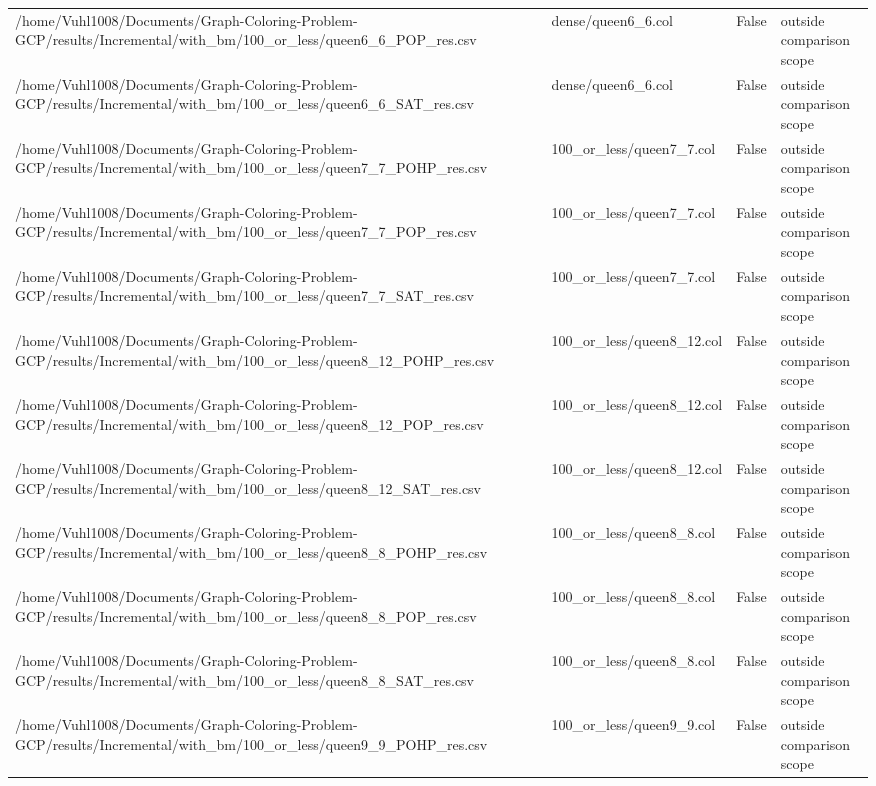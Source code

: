 \begin{table}[htbp]
\begin{tabular}{llll}
/home/Vuhl1008/Documents/Graph-Coloring-Problem-GCP/results/Incremental/with\_bm/100\_or\_less/queen6\_6\_POP\_res.csv & dense/queen6\_6.col & False & outside comparison scope \\
/home/Vuhl1008/Documents/Graph-Coloring-Problem-GCP/results/Incremental/with\_bm/100\_or\_less/queen6\_6\_SAT\_res.csv & dense/queen6\_6.col & False & outside comparison scope \\
/home/Vuhl1008/Documents/Graph-Coloring-Problem-GCP/results/Incremental/with\_bm/100\_or\_less/queen7\_7\_POHP\_res.csv & 100\_or\_less/queen7\_7.col & False & outside comparison scope \\
/home/Vuhl1008/Documents/Graph-Coloring-Problem-GCP/results/Incremental/with\_bm/100\_or\_less/queen7\_7\_POP\_res.csv & 100\_or\_less/queen7\_7.col & False & outside comparison scope \\
/home/Vuhl1008/Documents/Graph-Coloring-Problem-GCP/results/Incremental/with\_bm/100\_or\_less/queen7\_7\_SAT\_res.csv & 100\_or\_less/queen7\_7.col & False & outside comparison scope \\
/home/Vuhl1008/Documents/Graph-Coloring-Problem-GCP/results/Incremental/with\_bm/100\_or\_less/queen8\_12\_POHP\_res.csv & 100\_or\_less/queen8\_12.col & False & outside comparison scope \\
/home/Vuhl1008/Documents/Graph-Coloring-Problem-GCP/results/Incremental/with\_bm/100\_or\_less/queen8\_12\_POP\_res.csv & 100\_or\_less/queen8\_12.col & False & outside comparison scope \\
/home/Vuhl1008/Documents/Graph-Coloring-Problem-GCP/results/Incremental/with\_bm/100\_or\_less/queen8\_12\_SAT\_res.csv & 100\_or\_less/queen8\_12.col & False & outside comparison scope \\
/home/Vuhl1008/Documents/Graph-Coloring-Problem-GCP/results/Incremental/with\_bm/100\_or\_less/queen8\_8\_POHP\_res.csv & 100\_or\_less/queen8\_8.col & False & outside comparison scope \\
/home/Vuhl1008/Documents/Graph-Coloring-Problem-GCP/results/Incremental/with\_bm/100\_or\_less/queen8\_8\_POP\_res.csv & 100\_or\_less/queen8\_8.col & False & outside comparison scope \\
/home/Vuhl1008/Documents/Graph-Coloring-Problem-GCP/results/Incremental/with\_bm/100\_or\_less/queen8\_8\_SAT\_res.csv & 100\_or\_less/queen8\_8.col & False & outside comparison scope \\
/home/Vuhl1008/Documents/Graph-Coloring-Problem-GCP/results/Incremental/with\_bm/100\_or\_less/queen9\_9\_POHP\_res.csv & 100\_or\_less/queen9\_9.col & False & outside comparison scope \\

\end{tabular}
\end{table}
